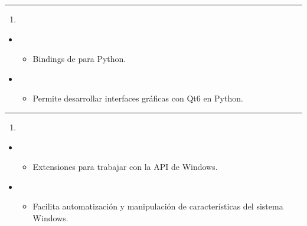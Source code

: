 \documentclass[a4paper,10pt,spanish]{sphinxmanual}
\begin{document}
\bigskip\hrule\bigskip

\begin{enumerate}
%
\setcounter{enumi}{22}
\item {} 
\sphinxAtStartPar
{}

\end{enumerate}
\begin{itemize}
\item {} 
\sphinxAtStartPar
{}
\begin{itemize}
\item {} 
\sphinxAtStartPar
Bindings de  para Python.

\end{itemize}

\item {} 
\sphinxAtStartPar
{}
\begin{itemize}
\item {} 
\sphinxAtStartPar
Permite desarrollar interfaces gráficas con Qt6 en Python.

\end{itemize}

\end{itemize}


\bigskip\hrule\bigskip

\begin{enumerate}
%
\setcounter{enumi}{23}
\item {} 
\sphinxAtStartPar
{}

\end{enumerate}
\begin{itemize}
\item {} 
\sphinxAtStartPar
{}
\begin{itemize}
\item {} 
\sphinxAtStartPar
Extensiones para trabajar con la API de Windows.

\end{itemize}

\item {} 
\sphinxAtStartPar
{}
\begin{itemize}
\item {} 
\sphinxAtStartPar
Facilita automatización y manipulación de características del sistema Windows.

\end{itemize}

\end{itemize}
\end{document}
